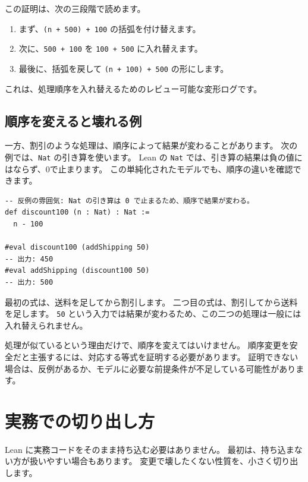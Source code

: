 この証明は、次の三段階で読めます。

\begin{enumerate}
\item まず、\texttt{(n + 500) + 100} の括弧を付け替えます。
\item 次に、\texttt{500 + 100} を \texttt{100 + 500} に入れ替えます。
\item 最後に、括弧を戻して \texttt{(n + 100) + 500} の形にします。
\end{enumerate}

これは、処理順序を入れ替えるためのレビュー可能な変形ログです。

\subsection{順序を変えると壊れる例}

一方、割引のような処理は、順序によって結果が変わることがあります。
次の例では、\texttt{Nat} の引き算を使います。
Lean の \texttt{Nat} では、引き算の結果は負の値にはならず、0で止まります。
この単純化されたモデルでも、順序の違いを確認できます。

\begin{listing}[htbp]
\begin{verbatim}
-- 反例の雰囲気: Nat の引き算は 0 で止まるため、順序で結果が変わる。
def discount100 (n : Nat) : Nat :=
  n - 100

#eval discount100 (addShipping 50)
-- 出力: 450
#eval addShipping (discount100 50)
-- 出力: 500
\end{verbatim}
\caption{\texttt{discount100}・\texttt{addShipping}}
\label{lst:ch09_order_not_safe}
\end{listing}

最初の式は、送料を足してから割引します。
二つ目の式は、割引してから送料を足します。
\texttt{50} という入力では結果が変わるため、この二つの処理は一般には入れ替えられません。

処理が似ているという理由だけで、順序を変えてはいけません。
順序変更を安全だと主張するには、対応する等式を証明する必要があります。
証明できない場合は、反例があるか、モデルに必要な前提条件が不足している可能性があります。

\section{実務での切り出し方}

Lean に実務コードをそのまま持ち込む必要はありません。
最初は、持ち込まない方が扱いやすい場合もあります。
変更で壊したくない性質を、小さく切り出します。

